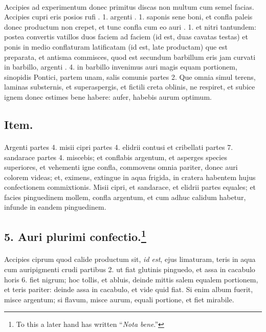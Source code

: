 \documentclass[a4paper, 11pt, oneside, polutonikogreek, italian]{article}
\begin{document}
\paragraph{}
Accipies ad experimentum donec primitus discas non multum cum semel facias. Accipies cupri eris posios rufi \roundz. 1. argenti \roundz. 1. saponis sene boni, et confla paleis donec productum non crepet, et tunc confla cum eo auri \roundz. 1. et nitri tantundem: postea convertis vatillos duos faciem ad faciem (id est, duas cavatas testas) et ponis in medio conflaturam latificatam (id est, late productam) que est preparata, et antisma commisces, quod est secundum barbillum eris jam curvati in barbillo, argenti \roundz. 4. in barbillo invenimus auri magis equam portionem, sinopidis Pontici, partem unam, salis comunis partes 2. Que omnia simul terens, laminas substernis, et superaspergis, et fictili creta oblinis, ne respiret, et subice ignem donec estimes bene habere: aufer, habebis aurum optimum.

\subsection{Item.}
\paragraph{}
Argenti partes 4. misii cipri partes 4. elidrii contusi et cribellati partes 7. sandarace partes 4. miscebis; et conflabis argentum, et asperges species superiores, et vehementi igne confla, commovens omnia pariter, donec auri colorem videas; et, eximens, extingue in aqua frigida, in cratera habentem hujus confectionem commixtionis. Misii cipri, et sandarace, et elidrii partes equales; et facies pinguedinem mollem, confla argentum, et cum adhuc calidum habetur, infunde in eandem pinguedinem.

\subsection[5. Auri plurimi confectio.]{5. Auri plurimi confectio.\footnote{To this a later hand has written ``\emph{Nota bene}.''}}
\paragraph{}
Accipies ciprum quod calide productum sit, \emph{id est}, ejus limaturam, teris in aqua cum auripigmenti crudi partibus 2. ut fiat glutinis pinguedo, et assa in cacabulo horis 6. fiet nigrum; hoc tollis, et abluis, deinde mittis salem equalem portionem, et teris pariter: deinde assa in cacabulo, et vide quid fiat. Si enim album fuerit, misce argentum; si flavum, misce aurum, equali portione, et fiet mirabile.
\end{document}
